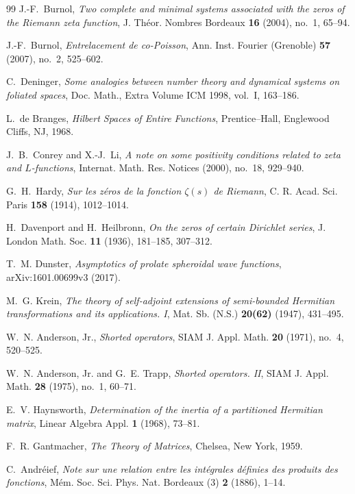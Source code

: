 \documentclass[11pt]{amsart}
\theoremstyle{definition}
\theoremstyle{remark}
\begin{document}
\begin{thebibliography}{99}
J.-F.~Burnol,
\emph{Two complete and minimal systems associated with the zeros of the
Riemann zeta function},
J. Th\'eor. Nombres Bordeaux \textbf{16} (2004), no.~1, 65--94.

J.-F.~Burnol,
\emph{Entrelacement de co-Poisson},
Ann. Inst. Fourier (Grenoble) \textbf{57} (2007), no.~2, 525--602.

C.~Deninger,
\emph{Some analogies between number theory and dynamical systems on
foliated spaces},
Doc. Math., Extra Volume ICM 1998, vol.~I, 163--186.

L.~de Branges,
\emph{Hilbert Spaces of Entire Functions},
Prentice--Hall, Englewood Cliffs, NJ, 1968.

J.~B.~Conrey and X.-J.~Li,
\emph{A note on some positivity conditions related to zeta and
\(L\)-functions},
Internat. Math. Res. Notices (2000), no.~18, 929--940.

G.~H.~Hardy,
\emph{Sur les z\'eros de la fonction \(\zeta(s)\) de Riemann},
C. R. Acad. Sci. Paris \textbf{158} (1914), 1012--1014.

H.~Davenport and H.~Heilbronn,
\emph{On the zeros of certain Dirichlet series},
J. London Math. Soc. \textbf{11} (1936), 181--185, 307--312.

T.~M. Dunster,
\emph{Asymptotics of prolate spheroidal wave functions},
arXiv:1601.00699v3 (2017).

M.~G. Krein,
\emph{The theory of self-adjoint extensions of semi-bounded Hermitian
transformations and its applications. I},
Mat. Sb. (N.S.) \textbf{20(62)} (1947), 431--495.

W.~N. Anderson, Jr.,
\emph{Shorted operators},
SIAM J. Appl. Math. \textbf{20} (1971), no.~4, 520--525.

W.~N. Anderson, Jr. and G.~E. Trapp,
\emph{Shorted operators. II},
SIAM J. Appl. Math. \textbf{28} (1975), no.~1, 60--71.

E.~V. Haynsworth,
\emph{Determination of the inertia of a partitioned Hermitian matrix},
Linear Algebra Appl. \textbf{1} (1968), 73--81.

F.~R. Gantmacher,
\emph{The Theory of Matrices},
Chelsea, New York, 1959.

C.~Andr\'eief,
\emph{Note sur une relation entre les int\'egrales d\'efinies des produits
des fonctions},
M\'em. Soc. Sci. Phys. Nat. Bordeaux (3) \textbf{2} (1886), 1--14.


\end{thebibliography}
\end{document}
